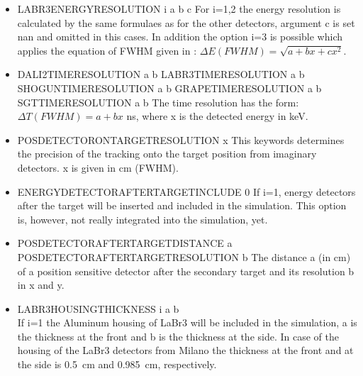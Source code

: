 \documentclass[12pt]{book}
\begin{document}
\begin{itemize}
\item LABR3ENERGYRESOLUTION i a b c\hfill{} \linebreak
  For i=1,2 the energy resolution is calculated by the same formulaes as for the other detectors, argument c is set nan and omitted in this cases. In addition the option i=3 is possible which applies the equation of FWHM given in \cite{Giaz2013910}: $\Delta E (FWHM) = \sqrt{a + bx + cx^2}$.

\item DALI2TIMERESOLUTION a b\hfill{} \linebreak
  LABR3TIMERESOLUTION a b\hfill{} \linebreak
  SHOGUNTIMERESOLUTION a b\hfill{} \linebreak
  GRAPETIMERESOLUTION a b\hfill{} \linebreak
  SGTTIMERESOLUTION a b\hfill{} \linebreak
 The time resolution has the form: $\Delta T (FWHM) = a + bx$ ns, where x is the detected energy in keV.
\item POSDETECTORONTARGETRESOLUTION x\hfill{} \linebreak
  This keywords determines the precision of the tracking onto the target position from imaginary detectors. x is 
  given in cm (FWHM).
\item ENERGYDETECTORAFTERTARGETINCLUDE 0\hfill{} \linebreak
  If i=1, energy detectors after the target will be inserted and included in the simulation. This option is, however,
  not really integrated into the simulation, yet.
\item POSDETECTORAFTERTARGETDISTANCE a\hfill{} \linebreak
  POSDETECTORAFTERTARGETRESOLUTION b\hfill{} \linebreak
  The distance a (in cm) of a position sensitive detector after the secondary target and its resolution b in x and 
  y.
  
\item LABR3HOUSINGTHICKNESS i a b\\
	If i=1 the Aluminum housing of LaBr3 will be included in the simulation, a is the thickness at the front and b is the thickness at the side. In case of the housing of the LaBr3 detectors from Milano the thickness at the front and at the side is 0.5~cm and 0.985~cm, respectively.


\end{itemize}
\end{document}
